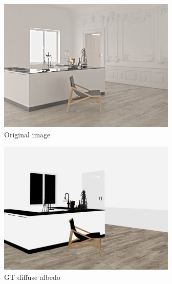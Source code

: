 \begin{figure}
  \centering
  \begin{subfigure}{0.32\linewidth}
    \includegraphics[width=\linewidth]{praca/images/AI43_004_Cam02.png}
    \caption{Original image}
  \end{subfigure}
  \begin{subfigure}{0.32\linewidth}
    \includegraphics[width=\linewidth]{praca/images/AI43_004_Cam02.albedo.png}
    \caption{GT diffuse albedo}
  \end{subfigure}
  \begin{subfigure}{0.32\linewidth}

\end{subfigure}
\end{figure}
